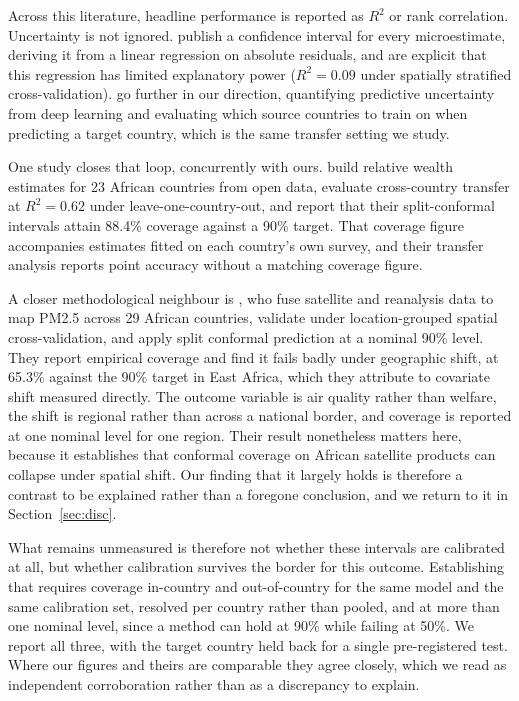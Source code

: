\documentclass[11pt]{article}
\begin{document}
Across this literature, headline performance is reported as $R^2$ or rank
correlation. Uncertainty is not ignored. \citet{chi2022} publish a confidence
interval for every microestimate, deriving it from a linear regression on
absolute residuals, and are explicit that this regression has limited
explanatory power ($R^2 = 0.09$ under spatially stratified cross-validation).
\citet{kakooei2024} go further in our direction, quantifying predictive
uncertainty from deep learning and evaluating which source countries to train
on when predicting a target country, which is the same transfer setting we
study.

One study closes that loop, concurrently with ours. \citet{olanrewaju2026}
build relative wealth estimates for 23 African countries from open data,
evaluate cross-country transfer at $R^2 = 0.62$ under leave-one-country-out, and
report that their split-conformal intervals attain 88.4\% coverage against a
90\% target. That coverage figure accompanies estimates fitted on each country's
own survey, and their transfer analysis reports point accuracy without a
matching coverage figure.

A closer methodological neighbour is \citet{adjei2026}, who fuse satellite and
reanalysis data to map PM2.5 across 29 African countries, validate under
location-grouped spatial cross-validation, and apply split conformal prediction
at a nominal 90\% level. They report empirical coverage and find it fails
badly under geographic shift, at 65.3\% against the 90\% target in East Africa,
which they attribute to covariate shift measured directly. The outcome variable
is air quality rather than welfare, the shift is regional rather than across a
national border, and coverage is reported at one nominal level for one region.
Their result nonetheless matters here, because it establishes that conformal
coverage on African satellite products can collapse under spatial shift. Our
finding that it largely holds is therefore a contrast to be explained rather
than a foregone conclusion, and we return to it in Section~\ref{sec:disc}.

What remains unmeasured is therefore not whether these intervals are calibrated
at all, but whether calibration survives the border for this outcome. Establishing that requires
coverage in-country and out-of-country for the same model and the same
calibration set, resolved per country rather than pooled, and at more than one
nominal level, since a method can hold at 90\% while failing at 50\%. We report
all three, with the target country held back for a single pre-registered test.
Where our figures and theirs are comparable they agree closely, which we read as
independent corroboration rather than as a discrepancy to explain.
\end{document}
